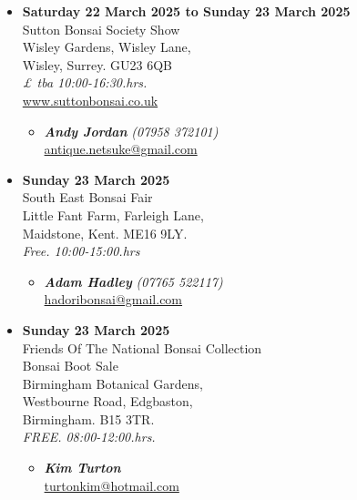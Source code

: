 \begin{itemize}
    \item \textbf{Saturday 22 March 2025 to Sunday 23 March 2025}
    \\
    Sutton Bonsai Society Show \\
    Wisley Gardens, Wisley Lane, \\
    Wisley, Surrey. GU23 6QB
    \\
    \emph{£ tba 10:00-16:30.hrs.}
    \\
    \href{https://www.suttonbonsai.co.uk}{www.suttonbonsai.co.uk}
    \begin{itemize}
        \item \textbf{\emph{Andy Jordan}} \emph{(07958 372101)} \\
        \href{mailto:antique.netsuke@gmail.com}{antique.netsuke@gmail.com}
    \end{itemize}

    \item \textbf{Sunday 23 March 2025}
    \\
    South East Bonsai Fair \\
    Little Fant Farm, Farleigh Lane, \\
    Maidstone, Kent. ME16 9LY.
    \\
    \emph{Free. 10:00-15:00.hrs}
    \begin{itemize}
        \item \textbf{\emph{Adam Hadley}} \emph{(07765 522117)} \\
        \href{mailto:hadoribonsai@gmail.com}{hadoribonsai@gmail.com}
    \end{itemize}

    \item \textbf{Sunday 23 March 2025}
    \\
    Friends Of The National Bonsai Collection \\
    Bonsai Boot Sale \\
    Birmingham Botanical Gardens, \\
    Westbourne Road, Edgbaston, \\
    Birmingham. B15 3TR.
    \\
    \emph{FREE. 08:00-12:00.hrs.}
    \begin{itemize}
        \item \textbf{\emph{Kim Turton}} \\
        \href{mailto:turtonkim@hotmail.com}{turtonkim@hotmail.com}
    \end{itemize}


\end{itemize}
